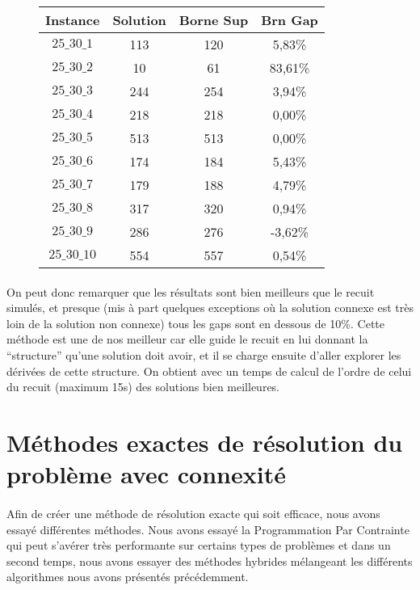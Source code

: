 \documentclass[a4paper, 11pt]{article} %
\begin{document}
\begin{center}
\begin{figure}[H]
      \begin{tabular}{|c|c|c|c|}
      \hline 
        Instance & Solution & Borne Sup & Brn Gap  \\ \hline
$25\_30\_1$ & 113 & 120 & 5,83\% \\ \hline
$25\_30\_2$ & 10 &  61 &  83,61\% \\ \hline
$25\_30\_3$ & 244 & 254 & 3,94\% \\ \hline
$25\_30\_4$ & 218 & 218 & 0,00\% \\ \hline
$25\_30\_5$ & 513 & 513 & 0,00\% \\ \hline
$25\_30\_6$ & 174 & 184 & 5,43\% \\ \hline
$25\_30\_7$ & 179 & 188 & 4,79\% \\ \hline
$25\_30\_8$ & 317 & 320 & 0,94\% \\ \hline
$25\_30\_9$ & 286 & 276 & -3,62\% \\ \hline
$25\_30\_10$ & 554 & 557 & 0,54\% \\ \hline
      \end{tabular}
\end{figure}
\end{center}

\paragraph*{}
On peut donc remarquer que les résultats sont bien meilleurs que le recuit simulés, et presque (mis à part quelques exceptions où la solution connexe est très loin de la solution non connexe) tous les gaps sont en dessous de 10\%. Cette méthode est une de nos meilleur car elle guide le recuit en lui donnant la ``structure'' qu'une solution doit avoir, et il se charge ensuite d'aller explorer les dérivées de cette structure. On obtient avec un temps de calcul de l'ordre de celui du recuit (maximum 15s) des solutions bien meilleures.

\section{Méthodes exactes de résolution du problème avec connexité}

\paragraph*{}
Afin de créer une méthode de résolution exacte qui soit efficace, nous avons essayé différentes méthodes. Nous avons essayé la Programmation Par Contrainte qui peut s'avérer très performante sur certains types de problèmes et dans un second temps, nous avons essayer des méthodes hybrides mélangeant les différents algorithmes nous avons présentés précédemment.
\end{document}
